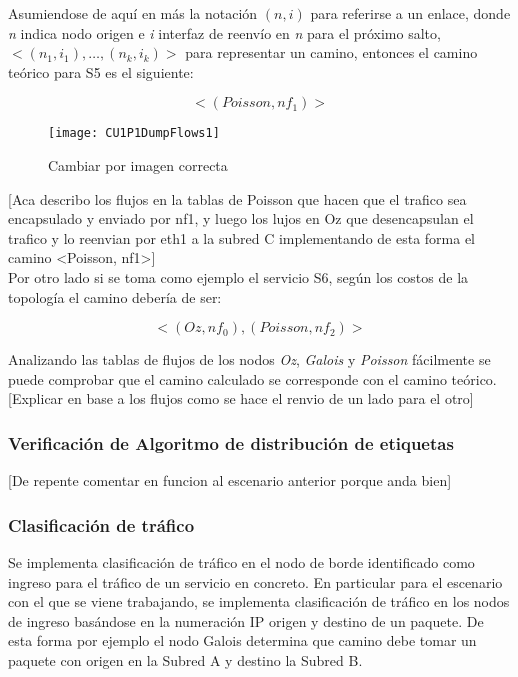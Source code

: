 Asumiendose de aqu\'i en m\'as la notaci\'on $(n, i)$ para referirse a un enlace, donde \textit{n} indica nodo origen e \textit{i} interfaz de reenvío en \textit{n} para el próximo salto, $<(n_1, i_1), \dots, (n_k, i_k)>$ para representar un camino, entonces el camino te\'orico para S5 es el siguiente:

 
$$<(Poisson, nf_1)>$$

\begin{figure}[ht!] 
\centering    
\texttt{[image: CU1P1DumpFlows1]}
\caption[Cambiar por imagen correcta]{Cambiar por imagen correcta}
\label{fig:CU1P1DumpFlows1}
\end{figure}

[Aca describo los flujos en la tablas de Poisson que hacen que el trafico sea encapsulado y enviado por nf1, y luego los lujos en Oz que desencapsulan el trafico y lo reenvian por eth1 a la subred C implementando de esta forma el camino <Poisson, nf1>]\\

Por otro lado si se toma como ejemplo el servicio S6, seg\'un los costos de la topolog\'ia el camino deber\'ia de ser:

$$<(Oz, nf_0), (Poisson, nf_2)>$$ 

Analizando las tablas de flujos de los nodos \textit{Oz}, \textit{Galois} y \textit{Poisson} fácilmente se puede comprobar que el camino calculado se corresponde con el camino te\'orico.\\

[Explicar en base a los flujos como se hace el renvio de un lado para el otro]\\

\subsubsection{Verificaci\'on de Algoritmo de distribución de etiquetas}

[De repente comentar en funcion al escenario anterior porque anda bien]

\subsubsection{Clasificaci\'on de tr\'afico}
Se implementa clasificaci\'on de tr\'afico en el nodo de borde identificado como ingreso para el tr\'afico de un servicio en concreto. En particular para el escenario con el que se viene trabajando, se implementa clasificaci\'on de tr\'afico en los nodos de ingreso basándose en la numeraci\'on IP origen y destino de un paquete. De esta forma por ejemplo el nodo Galois determina que camino debe tomar un paquete con origen en la Subred A y destino la Subred B. 

